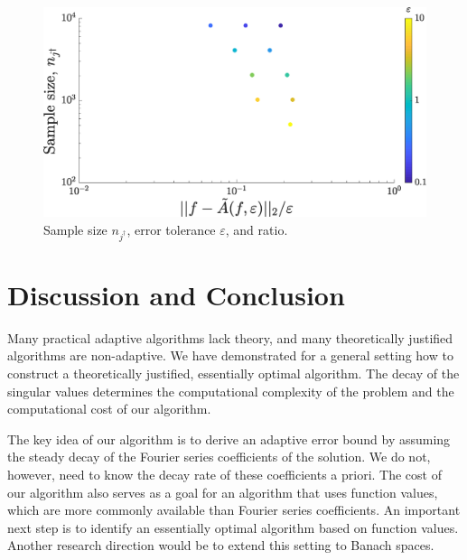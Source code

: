 \documentclass[graybox,footinfo]{svmult}
\begin{document}
\begin{figure}[ht]
 	\centering
 		\includegraphics[width =7.5 cm]{ProgramsImages/SimFourCoefErr.eps}
 	\caption{Sample size $n_{j^{\dagger}}$, error tolerance $\varepsilon$, and ratio. \label{errfig}} %
 \end{figure}

\section{Discussion and Conclusion} \label{sec:conc}
Many practical adaptive algorithms lack theory, and many theoretically justified algorithms are non-adaptive.  We have demonstrated for a general setting how to construct a theoretically justified, essentially optimal algorithm.  The decay of the singular values determines the computational complexity of the problem and the computational cost of our algorithm.  

The key idea of our algorithm is to derive an adaptive error bound by assuming the steady decay of the Fourier series coefficients of the solution.  We do not, however, need to know the decay rate of these coefficients a priori.  The cost of our algorithm also serves as a goal for an algorithm that uses function values, which are more commonly available than Fourier series coefficients.  An important next step is to identify an essentially optimal algorithm based on function values.  Another research direction would be to extend this setting to Banach spaces.
	



\end{document}

